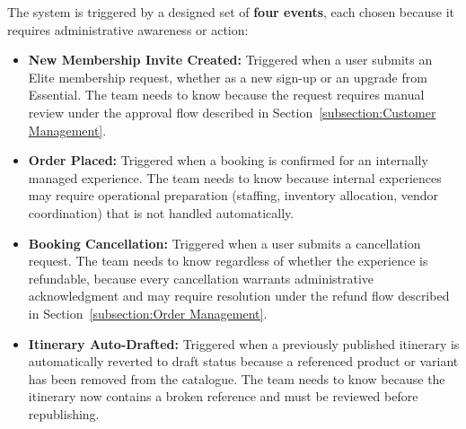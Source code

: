 The system is triggered by a designed set of \textbf{four events}, each chosen because it requires administrative awareness or action:
\begin{itemize}
    \item \textbf{New Membership Invite Created:} Triggered when a user submits an Elite membership request, whether as a new sign-up or an upgrade from Essential. The team needs to know because the request requires manual review under the approval flow described in Section~\ref{subsection:Customer Management}.
    \item \textbf{Order Placed:} Triggered when a booking is confirmed for an internally managed experience. The team needs to know because internal experiences may require operational preparation (staffing, inventory allocation, vendor coordination) that is not handled automatically.
    \item \textbf{Booking Cancellation:} Triggered when a user submits a cancellation request. The team needs to know regardless of whether the experience is refundable, because every cancellation warrants administrative acknowledgment and may require resolution under the refund flow described in Section~\ref{subsection:Order Management}.
    \item \textbf{Itinerary Auto-Drafted:} Triggered when a previously published itinerary is automatically reverted to draft status because a referenced product or variant has been removed from the catalogue. The team needs to know because the itinerary now contains a broken reference and must be reviewed before republishing.
\end{itemize}
